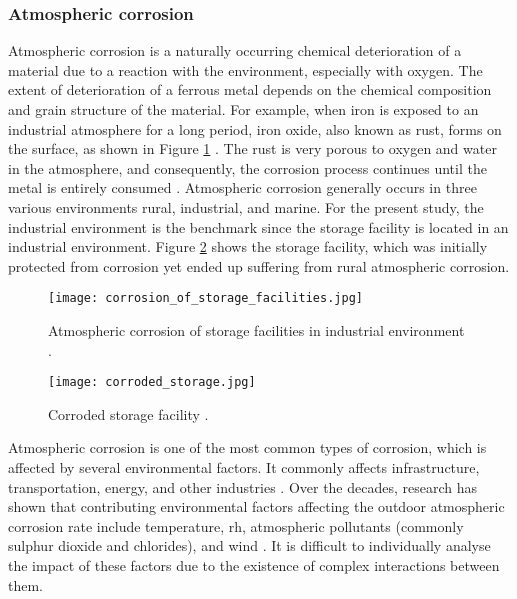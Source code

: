 \subsubsection{Atmospheric corrosion}
Atmospheric corrosion is a naturally occurring chemical deterioration of a material due to a reaction with the environment, especially with oxygen. The extent of deterioration of a ferrous metal depends on the chemical composition and grain structure of the material. For example, when iron is exposed to an industrial atmosphere for a long period, iron oxide, also known as rust, forms on the surface, as shown in Figure \ref{ch3:figure:corrosion} \cite{mcarthur2004engineering}. The rust is very porous to oxygen and water in the atmosphere, and consequently, the corrosion process continues until the metal is entirely consumed \cite{protopopoff2011surface}.  Atmospheric corrosion generally occurs in three various environments rural, industrial, and marine. For the present study, the industrial environment is the benchmark since the storage facility is located in an industrial environment. Figure \ref{ch3:figure:corroded} shows the storage facility, which was initially protected from corrosion yet ended up suffering from rural atmospheric corrosion.

\begin{figure}[H]
    \centering
    \texttt{[image: corrosion\_of\_storage\_facilities.jpg]}
    \caption{Atmospheric corrosion of storage facilities in industrial environment \cite{chigondo2016recent}.}
    \label{ch3:figure:corrosion}
\end{figure}
 
\begin{figure}[H]
    \centering
    \texttt{[image: corroded\_storage.jpg]}
    \caption{Corroded storage facility \cite{protopopoff2011surface}.}
    \label{ch3:figure:corroded}
\end{figure}

Atmospheric corrosion is one of the most common types of corrosion, which is affected by several environmental factors. It commonly affects infrastructure, transportation, energy, and other industries \cite{pei2021understanding}. Over the decades, research has shown that contributing environmental factors affecting the outdoor atmospheric corrosion rate include temperature, \acrfull{rh}, atmospheric pollutants (commonly sulphur dioxide and chlorides), and wind \cite{abou2001mechanical, islam2018effects}. It is difficult to individually analyse the impact of these factors due to the existence of complex interactions between them.

